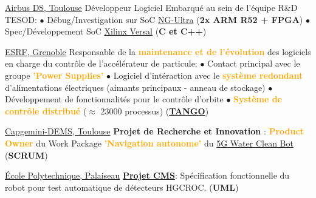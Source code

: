 \documentclass[
	a4paper,
	subsectioncolor=cvblue!70,
]{fortysecondscv}
\newcommand{\tango}{\href{https://www.tango-controls.org/}{TANGO}}
\newcommand{\hl}[1]{\textbf{\textcolor{orange}{#1}}}
\begin{document}
\begin{cvtable}[2]
         {\href{https://fr.wikipedia.org/wiki/Airbus_Defence_and_Space}{Airbus DS, Toulouse}}
  {
    Développeur Logiciel Embarqué au sein de l'équipe R\&D TESOD:\newline
    $\bullet$ Débug/Investigation sur SoC
    \href{https://nanoxplore.org/index.php/product/ng-ultra/}{NG-Ultra} (\textbf{2x ARM
    R52 + FPGA})\newline
    $\bullet$ Spec/Développement SoC
    \href{https://www.xilinx.com/products/silicon-devices/acap/versal-ai-core.html}{Xilinx
      Versal} (\textbf{C et C++})
  }

  {\href{https://www.esrf.fr/}{ESRF, Grenoble}}
  {
    Responsable de la \hl{maintenance et de l'évolution} des logiciels en charge
    du contrôle de l'accélérateur de particule:\newline
    $\bullet$ Contact principal avec le groupe \hl{'Power Supplies'}\newline
    $\bullet$ Logiciel d'intéraction avec le \hl{système redondant} d'alimentations
    électriques (aimants principaux - anneau de stockage)\newline
    $\bullet$ Développement de fonctionnalités pour le contrôle d'orbite\newline
    $\bullet$ \hl{Système de contrôle distribué} ($\approx$ 23000 processus)
    (\hl{\textbf{\tango}})
  }

  {\href{https://www.capgemini.com/service/digital-services/digital-engineering-and-manufacturing-services/}{Capgemini-DEMS,
      Toulouse}}
  {
    \textbf{Projet de Recherche et Innovation} : \hl{Product Owner} du Work
    Package \hl{'Navigation autonome'} du
    \href{https://www.capgemini.com/fr-fr/solutions/5g-water-clean-bot/}{5G
      Water Clean Bot} (\textbf{SCRUM})
  }

  {\href{https://www.polytechnique.edu/fr/le-laboratoire-leprince-ringuet-llr}{École
      Polytechnique, Palaiseau}}
  {
    \hl{\textbf{\href{http://polywww.in2p3.fr/-cms-45-?lang=fr}{Projet CMS}}}:
    Spécification fonctionnelle du robot pour test automatique de détecteurs
    HGCROC. (\textbf{UML})
  }


\end{cvtable}
\end{document}
